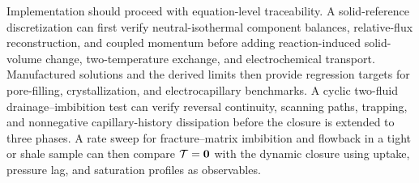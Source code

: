 Implementation should proceed with equation-level traceability.  A
solid-reference discretization can first verify neutral-isothermal component
balances, relative-flux reconstruction, and coupled momentum before adding
reaction-induced solid-volume change, two-temperature exchange, and
electrochemical transport.  Manufactured solutions and the derived limits then
provide regression targets for pore-filling, crystallization, and
electrocapillary benchmarks.  A cyclic two-fluid drainage--imbibition test can
verify reversal continuity, scanning paths, trapping, and nonnegative
capillary-history dissipation before the closure is extended to three phases.
A rate sweep for fracture--matrix imbibition and flowback in a tight or shale
sample can then compare \(\mathcal{T}=\mathbf{0}\) with the dynamic closure using uptake,
pressure lag, and saturation profiles as observables.
